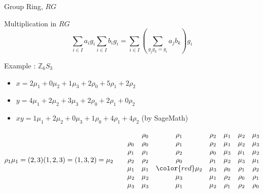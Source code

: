 \documentclass{beamer}
\begin{document}
\begin{frame}{Group Ring, $RG$}
\begin{block}{Multiplication in $RG$}
	$$ \sum_{i \in I} a_ig_i \sum_{i \in I} b_ig_i = \sum_{i \in I} \left( \sum_{g_jg_k = g_i} a_jb_k \right) g_i $$
\end{block}
\begin{exampleblock}{Example : $\mathbb{Z}_6S_3$}
\begin{itemize}
	\item $x = 2\mu_1 + 0\mu_2 + 1\mu_3 + 2\rho_0 + 5\rho_1 + 2\rho_2$
	\item $y = 4\mu_1 + 2\mu_2 + 3\mu_3 + 2\rho_0 + 2\rho_1 + 0\rho_2$
	\item $xy = 1\mu_1 + 2\mu_2 + 0\mu_3 + 1\rho_0 + 4\rho_1 + 4\rho_2$ (by SageMath)
\end{itemize}
\end{exampleblock}
{\scriptsize
	$$\rho_1\mu_1 = (2,3)(1,2,3) = (1,3,2) = \mu_2 \qquad \begin{matrix}
	       & \rho_0 & \rho_1 & \rho_2 & \mu_1  & \mu_2  & \mu_3  \\	
	\rho_0 & \rho_0 & \rho_1 & \rho_2 & \mu_1  & \mu_2  & \mu_3  \\
	\rho_1 & \rho_1 & \rho_2 & \rho_0 & \mu_3  & \mu_1  & \mu_2  \\
	\rho_2 & \rho_2 & \rho_0 & \rho_1 & \mu_2  & \mu_3  & \mu_1  \\
	\mu_1  & \mu_1  & {\color{red}\mu_2}  & \mu_3  & \rho_0 & \rho_1 & \rho_2 \\
	\mu_2  & \mu_2  & \mu_3  & \mu_1  & \rho_2 & \rho_0 & \rho_1 \\
	\mu_3  & \mu_3  & \mu_1  & \mu_2  & \rho_1 & \rho_2 & \rho_0 
\end{matrix}$$
	}
\end{frame}
\end{document}
